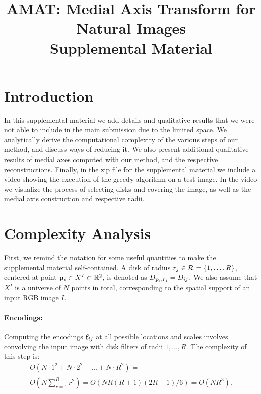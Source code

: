 \documentclass[10pt,twocolumn,letterpaper]{article}
\begin{document}
\title{AMAT: Medial Axis Transform for Natural Images \\ Supplemental Material}
\maketitle

\section{Introduction}\label{sec:introduction}
In this supplemental material we add details and qualitative results that we were not able to include in the main submission due to the limited space.
We analytically derive the computational complexity of the various steps of our method, and discuss ways of reducing it.
We also present additional qualitative results of medial axes computed with our method, and the respective reconstructions.
Finally, in the zip file for the supplemental material we include a video showing the execution of the greedy algorithm on a test image.
In the video we visualize the process of selecting disks and covering the image, as well as the medial axis construction and respective radii.

\section{Complexity Analysis}\label{sec:complexity}
First, we remind the notation for some useful quantities to make the supplemental material self-contained.
A disk of radius $r_j\in \mathcal{R} = \{1,\ldots,R\}$, 
centered at point $\mathbf{p}_{i}\in X^I \subset \mathbb{R}^2$, is denoted as $D_{\mathbf{p}_{i},r_j} = D_{ij}$.
We also assume that $X^I$ is a universe of $N$ points in total, corresponding to the spatial support of an input RGB image $I$.

\paragraph{Encodings:} Computing the encodings $\mathbf{f}_{ij}$ at all possible locations and scales involves convolving the input image 
with disk filters of radii $1,\ldots,R$. 
The complexity of this step is:
\begin{align}
\nonumber
O(N\cdot 1^2 + N\cdot 2^2 + \ldots + N \cdot R^2) = \\
O(N\sum_{r=1}^R r^2) = O(NR(R+1)(2R+1)/6) = O(NR^3).
\end{align}
\end{document}
